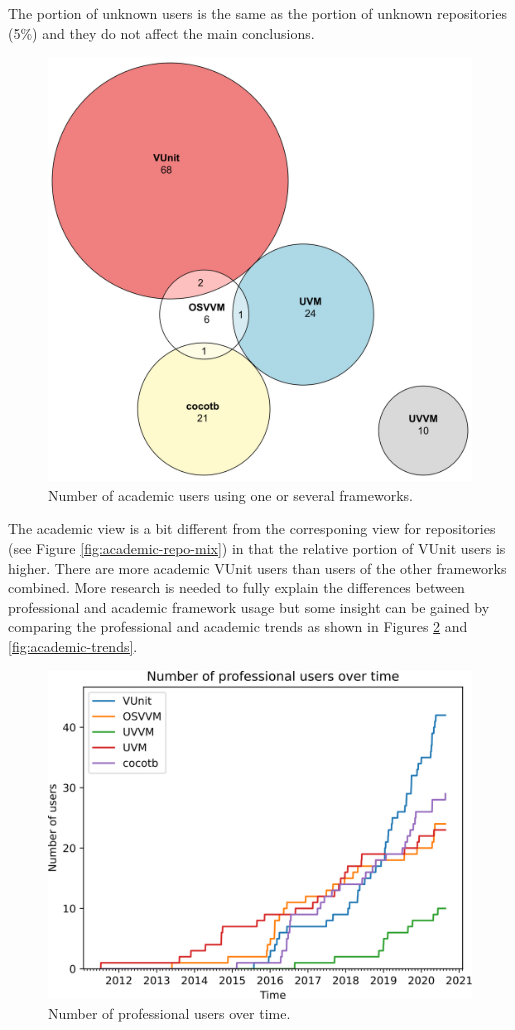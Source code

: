 \documentclass[]{article}
\begin{document}
The portion of unknown users is the same as the portion of unknown repositories (5\%) and they do not affect the main conclusions.

\begin{figure}

{\centering \includegraphics[width=0.75\linewidth]{img/academic_user} 

}

\caption{Number of academic users using one or several frameworks.}\label{fig:academic-user}
\end{figure}

The academic view is a bit different from the corresponing view for repositories (see Figure \ref{fig:academic-repo-mix}) in that the relative portion of VUnit users is higher. There are more academic VUnit users than users of the other frameworks combined. More research is needed to fully explain the differences between professional and academic framework usage but some insight can be gained by comparing the professional and academic trends as shown in Figures \ref{fig:pro-trends} and \ref{fig:academic-trends}.

\begin{figure}

{\centering \includegraphics[width=0.75\linewidth]{img/professional_users_over_time} 

}

\caption{Number of professional users over time.}\label{fig:pro-trends}
\end{figure}
\end{document}
